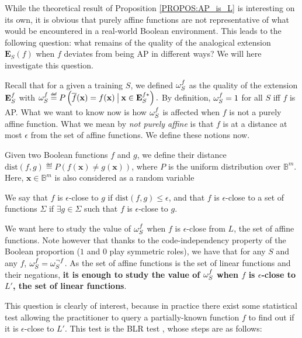 While the theoretical result of Proposition \ref{PROPOS:AP_is_L} is interesting
on its own, it is obvious that purely affine functions are not representative
of what would be encountered in a real-world Boolean environment.  This leads to the
following question: what remains of the quality of the analogical extension
$\mathbf{E}_S(f)$ when $f$ deviates from being AP in different ways? We will
here investigate this question.

Recall that for a given a training $S$, we defined $\omega_{S}^{f}$ as the quality of the
extension $\mathbf{E}_{S}^{f}$ with $\omegasf \eqdef P\left(\albl{\mathbf{x}} = f(\mathbf{x})
\given[\big] \mathbf{x} \in \esfs\right).$ By definition, $\omega_{S}^{f}=1$ for all
$S$ iff $f$ is AP. What we want to know now is how $\omega_{S}^{f}$ is affected when
$f$ is not a purely affine function. What we
mean by \textit{not purely affine} is that $f$ is at a distance at most
$\epsilon$ from the set
of affine functions. We define these notions now.

Given two Boolean functions $f$ and $g$, we define their distance
$\text{dist}(f, g) \eqdef P\left(f(\mathbf{x}) \neq
g(\mathbf{x})\right)$, where $P$ is the uniform distribution over
$\mathbb{B}^m$. Here, $\mathbf{x} \in \mathbb{B}^m$ is also considered as a
random variable

\begin{definition}
We say that $f$ is $\epsilon$-close to $g$ if $\text{dist}(f, g) \leq
  \epsilon$, and that $f$ is $\epsilon$-close to a set of functions $\Sigma$ if
  $\exists g \in \Sigma$ such that $f$ is $\epsilon$-close to $g$.
\end{definition}

We want here to study the value of $\omega_{S}^{f}$ when $f$ is $\epsilon$-close from
$L$, the set of affine functions. Note however that thanks to the
code-independency property of the Boolean proportion ($1$ and $0$ play
symmetric roles), we have that for any $S$ and any $f$, $\omega_{S}^{f} =
\omega_S^{\neg f}$. As the set of affine functions is the set of linear
functions and their negations, \textbf{it is enough to study the value of
$\omega_{S}^{f}$ when $f$ is $\epsilon$-close to $L'$, the set of linear functions}.

This question is clearly of interest, because in practice there exist some
statistical test allowing the practitioner to query a partially-known function
$f$ to find out if it is $\epsilon$-close to $L'$. This test is the BLR test
\cite{BluLubRub93}, whose steps are as follows:

